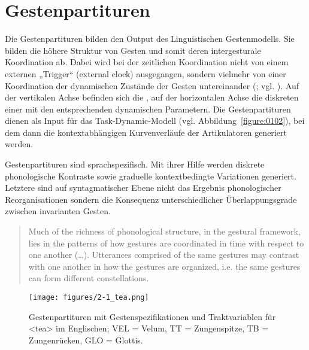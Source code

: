 \chapter{Gestenpartituren}
\label{chap:02}

Die Gestenpartituren bilden den Output des Linguistischen Gestenmodells. Sie bilden die höhere Struktur von Gesten und somit deren intergesturale Koordination ab. Dabei wird bei der zeitlichen Koordination nicht von einem externen „Trigger“ (external clock) ausgegangen, sondern vielmehr von einer Koordination der dynamischen Zustände der Gesten untereinander (; vgl. \citealt{Kelso1987, Browman1991a, Browman1992a}). Auf der vertikalen Achse befinden sich die , auf der horizontalen Achse die diskreten  einer  mit den entsprechenden dynamischen Parametern. Die Gestenpartituren dienen als Input für das Task-Dynamic-Modell (vgl. Abbildung~\ref{figure:0102}), bei dem dann die kontextabhängigen Kurvenverläufe der Artikulatoren generiert werden.

Gestenpartituren sind sprachspezifisch. Mit ihrer Hilfe werden diskrete phonologische Kontraste sowie graduelle kontextbedingte Variationen generiert. Letztere sind auf syntagmatischer Ebene nicht das Ergebnis phonologischer Reorganisationen sondern die Konsequenz unterschiedlicher Überlappungsgrade zwischen invarianten Gesten.

\begin{quote}
	Much of the richness of phonological structure, in the gestural framework, lies in the patterns of how gestures are coordinated in time with respect to one another (…). Utterances comprised of the same gestures may contrast with one another in how the gestures are organized, i.e. the same gestures can form different constellations. \citep[][162]{Browman1992a}
\end{quote}



\begin{figure}
	\texttt{[image: figures/2-1\_tea.png]}
	\caption{Gestenpartituren mit Gestenspezifikationen und Traktvariablen für <tea> im Englischen; VEL = Velum, TT = Zungenspitze, TB = Zungenrücken, GLO = Glottis.}
	\label{figure:0201}
\end{figure}

